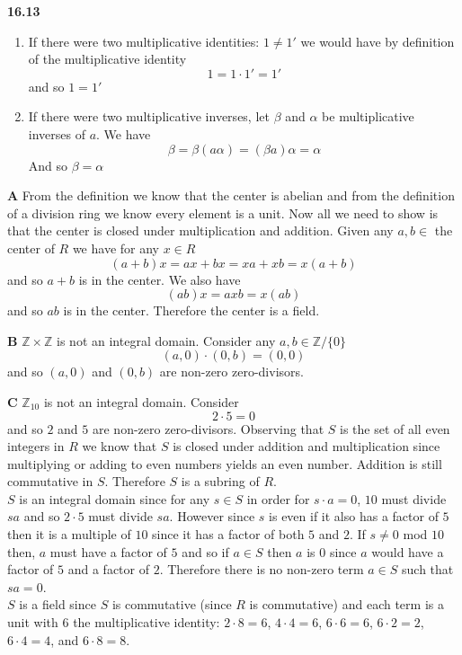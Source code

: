 \documentclass[12pt]{article}
\newenvironment{ques}{\vspace{2 ex}}{\vspace{2 ex}}
\theoremstyle{definition}
\begin{document}
\begin{ques}
	\textbf{16.13}
	\begin{enumerate}
		\item
			If there were two multiplicative identities: $1
			\neq 1'$ we would have by definition of the
			multiplicative identity
			$$1 = 1\cdot1' = 1'$$
			and so $1 = 1'$
		\item
			If there were two multiplicative inverses, let
			$\beta$ and $\alpha$ be multiplicative
			inverses of $a$. We have
			$$\beta = \beta(a \alpha) = (\beta a)\alpha =
			\alpha$$
			And so $\beta = \alpha$
	\end{enumerate}
\end{ques}

\begin{ques}
	\textbf{A}
	From the definition we know that the center is abelian and from
	the definition of a division ring we know every element is a
	unit. Now all we need to show is that the center is closed
	under multiplication and addition. Given any $a, b \in $ the
	center of $R$ we have for any $x \in R$
	$$(a + b)x = ax + bx = xa + xb = x(a + b)$$ 
	and so $a + b$ is in the center. We also have
	$$(ab)x = axb = x(ab)$$
	and so $ab$ is in the center. Therefore the center is a field.
\end{ques}

\begin{ques}
	\textbf{B}
	$\mathbb Z \times \mathbb Z$ is not an integral domain.
	Consider any $a, b \in \mathbb Z / \{0\}$
	$$(a, 0) \cdot (0, b) = (0,0)$$
	and so $(a,0)$ and $(0,b)$ are non-zero zero-divisors.
\end{ques}

\begin{ques}
	\textbf{C}
	$\mathbb Z_{10}$ is not an integral domain. Consider
	$$2 \cdot 5 = 0$$
	and so $2$ and $5$ are non-zero zero-divisors. Observing that
	$S$ is the set of all even integers in $R$ we know that $S$ is
	closed under addition and multiplication since multiplying or
	adding to even numbers yields an even number. Addition is still
	commutative in $S$. Therefore $S$ is a subring of $R$. \\
	$S$ is an integral domain since for any $s \in S$ in order for
	$s \cdot a = 0$, $10$ must divide $sa$ and so $2 \cdot 5$ must
	divide $sa$. However since $s$ is even if it also has a factor
	of $5$ then it is a multiple of $10$ since it has a factor of
	both $5$ and $2$. If $s \neq 0$ mod $10$ then, $a$ must have a
	factor of $5$ and so if $a \in S$ then $a$ is $0$ since $a$
	would have a factor of $5$ and a factor of $2$. Therefore there
	is no non-zero term $a \in S$ such that $sa = 0$.\\
	$S$ is a field since $S$ is commutative (since $R$ is
	commutative) and each term is a unit with $6$ the
	multiplicative identity: $2 \cdot 8 = 6$, $4 \cdot 4 = 6$, $6
	\cdot 6 = 6$, $6 \cdot 2 = 2$, $6 \cdot 4 = 4$, and $6 \cdot 8
	= 8$.
\end{ques}
\end{document}
